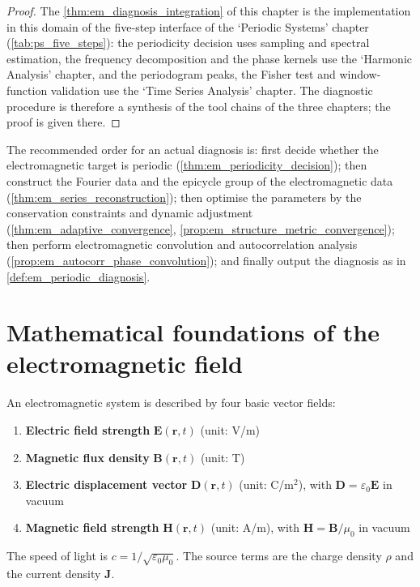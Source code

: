 \begin{proof}
The \cref{thm:em_diagnosis_integration} of this chapter is the implementation in this domain of the five-step interface of the `Periodic Systems' chapter (\cref{tab:ps_five_steps}):
the periodicity decision uses sampling and spectral estimation, the frequency decomposition and the phase kernels use the `Harmonic Analysis' chapter, and the periodogram peaks, the Fisher test and
window-function validation use the `Time Series Analysis' chapter. The diagnostic procedure is therefore a synthesis of the tool chains of the three chapters; the proof is given there.
\end{proof}

\begin{remark}\label{rem:em_integration_order}
The recommended order for an actual diagnosis is: first decide whether the electromagnetic target is periodic (\cref{thm:em_periodicity_decision}); then construct the Fourier data and the epicycle group of the electromagnetic data (\cref{thm:em_series_reconstruction}); then optimise the parameters by the conservation constraints and dynamic adjustment (\cref{thm:em_adaptive_convergence}, \cref{prop:em_structure_metric_convergence}); then perform electromagnetic convolution and autocorrelation analysis (\cref{prop:em_autocorr_phase_convolution}); and finally output the diagnosis as in \cref{def:em_periodic_diagnosis}.
\end{remark}

\section{Mathematical foundations of the electromagnetic field}

\begin{definition}\label{def:electromagnetic_fields}
An electromagnetic system is described by four basic vector fields:
\begin{enumerate}[label=(\roman*)]
    \item \textbf{Electric field strength} $\mathbf{E}(\mathbf{r}, t)$ (unit: V/m)
    \item \textbf{Magnetic flux density} $\mathbf{B}(\mathbf{r}, t)$ (unit: T)
    \item \textbf{Electric displacement vector} $\mathbf{D}(\mathbf{r}, t)$ (unit: C/m$^2$), with $\mathbf{D} = \varepsilon_0 \mathbf{E}$ in vacuum
    \item \textbf{Magnetic field strength} $\mathbf{H}(\mathbf{r}, t)$ (unit: A/m), with $\mathbf{H} = \mathbf{B}/\mu_0$ in vacuum
\end{enumerate}
The speed of light is $c = 1/\sqrt{\varepsilon_0 \mu_0}$. The source terms are the charge density $\rho$ and the current density $\mathbf{J}$.
\end{definition}

